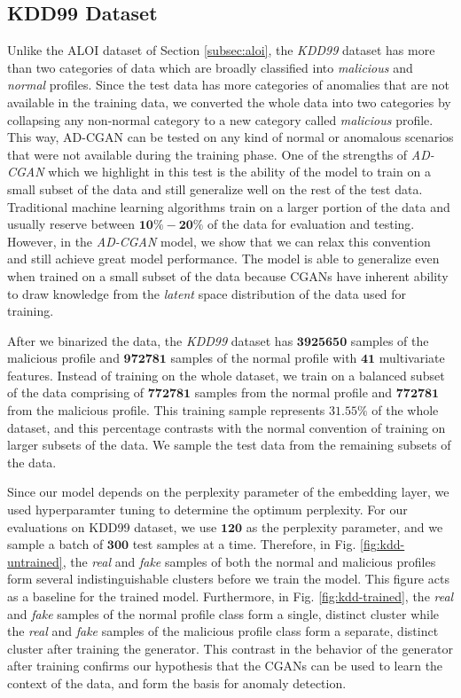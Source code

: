 \subsection{KDD99 Dataset}
\label{subsec:kdd}
Unlike the ALOI dataset of Section \ref{subsec:aloi}, the \textit{KDD99} dataset has more than two categories of data which are broadly classified into \textit{malicious} and \textit{normal} profiles. Since the test data has more categories of anomalies that are not available in the training data, we converted the whole data into two categories by collapsing any non-normal category to a new category called \textit{malicious} profile. This way, AD-CGAN can be tested on any kind of normal or anomalous scenarios that were not available during the training phase. One of the strengths of \textit{AD-CGAN} which we highlight in this test is the ability of the model to train on a small subset of the data and still generalize well on the rest of the test data. Traditional machine learning algorithms train on a larger portion of the data and usually reserve between $ \bm{10\%-20\%} $ of the data for evaluation and testing. However, in the \textit{AD-CGAN} model, we show that we can relax this convention and still achieve great model performance. The model is able to generalize even when trained on a small subset of the data because CGANs have inherent ability to draw knowledge from the \textit{latent} space distribution of the data used for training. \par 
After we binarized the data, the \textit{KDD99} dataset has $ \bm{3925650} $ samples of the malicious profile and $ \bm{972781} $ samples of the normal profile with $ \bm{41} $ multivariate features. Instead of training on the whole dataset, we train on a balanced subset of the data comprising of $ \bm{772781} $ samples from the normal profile and $ \bm{772781} $ from the malicious profile. This training sample represents $ \bm{31.55\%} $ of the whole dataset, and this percentage contrasts with the normal convention of training on larger subsets of the data. We sample the test data from the remaining subsets of the data. \par 
Since our model depends on the perplexity parameter of the embedding layer, we used hyperparamter tuning to determine the optimum perplexity. For our evaluations on KDD99 dataset, we use $ \bm{120} $ as the perplexity parameter, and we sample a batch of $ \bm{300} $ test samples at a time. Therefore, in Fig. \ref{fig:kdd-untrained}, the \textit{real} and \textit{fake} samples of both the normal and malicious profiles form several indistinguishable clusters before we train the model. This figure acts as a baseline for the trained model. Furthermore, in Fig. \ref{fig:kdd-trained}, the \textit{real} and \textit{fake} samples of the normal profile class form a single, distinct cluster while the \textit{real} and \textit{fake} samples of the malicious profile class form a separate, distinct cluster after training the generator. This contrast in the behavior of the generator after training confirms our hypothesis that the CGANs can be used to learn the context of the data, and form the basis for anomaly detection.

